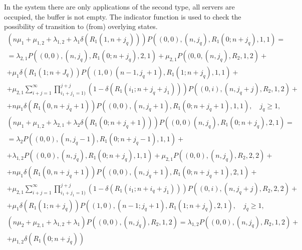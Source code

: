 {In the system there are only applications of the second type, all
servers are occupied, the buffer is not empty. The indicator function
is used to check the possibility of transition to (from) overlying
states.
\begin{multline}
  \left(n\mu_1+\mu_{1,2}+\lambda_{1,2}+\lambda_1 \delta\left(R_1
      (1,n+j_q)\right)\right) P\left((0,0),(n,j_q),R_1
    (0;n+j_q),1,1\right) = \\ = \lambda_{2,1} P\left((0,0),(n,j_q),R_1
    (0;n+j_q),2,1\right)+ \mu_{2,1}
  P\left((0,0,(n,j_q),R_2,1,2\right)+ \\ + \mu_1 \delta\left(R_1
    (1;n+J_q)\right) P\left((1,0)(n-1,j_q+1),R_1 (1;n+j_q),1,1\right)+
  \\ + \mu_{2,1}
  \sum\limits_{i+j=1}^{\infty}\prod\limits_{i_1+j_1=1)}^{j+j}\left(1-\delta\left(R_1
      (i_1;n+j_q+j_1) \right)\right)
  P\left((0,i),(n,j_q+j),R_2,1,2\right)+\\ + n\mu_1 \delta\left(R_1
    (0, n+j_q+1)\right) P\left((0,0),(n,j_q+1),R_1
    (0;n+j_q+1),1,1\right), \quad j_q\geqslant 1,
\label{eq:7.1}
\end{multline}
\begin{multline}
  \left(n\mu_1+\mu_{1,2}+\lambda_{2,1}+\lambda_2\delta\left(R_1
      (0;n+j_q+1)\right)\right) P\left((0,0)(n,j_q),R_1
    (0;n+j_q),2,1\right) = \\ = \lambda_2 P\left((0,0),(n,j_q-1),R_1
    (0;n+j_q-1),1,1\right)+ \\ + \lambda_{1,2} P\left((0,0),(n,j_q),R_1
    (0;n+j_q),1,1\right)+ %
  \mu_{2,1}
  P\left((0,0),(n,j_q),R_2,2,2\right)+\\ + n\mu_1 \delta\left(R_1
    (0,n+j_q+1)\right) P\left((0,0),(n,j_q+1),R_1
    (0;n+j_q+1),2,1\right) +\\ + \mu_{2,1}
  \sum\limits_{i+j=1}^{\infty}\prod\limits_{i_1+j_1=1)}^{j+j}\left(1-\delta\left(R_1
      (i_1;n+i_q+j_1) \right)\right)
  P\left((0,i),(n,j_q+j),R_2,2,2\right)+\\ + \mu_1 \delta\left(R_1
    (1;n+j_q)\right) P\left((1,0),(n-1;j_q+1),R_1
    (1;n+j_q),2,1\right), \quad j_q\geqslant 1,
\label{eq:7.2}
\end{multline}
\begin{multline}
  \left(n\mu_2+\mu_{2,1}+\lambda_{1,2}+\lambda_1\right)
  P\left((0,0),(n,j_q),R_2,1,2\right) =
  \lambda_{1,2} P\left((0,0),(n,j_q),R_2,1,2\right)+ \\ +
  \mu_{1,2}\delta\left(R_1(0;n+j_q)\right)

\end{multline}}
